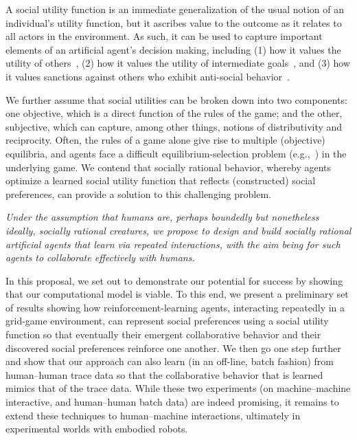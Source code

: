 A social utility function is an immediate generalization of the usual
notion of an individual's utility function, but it ascribes value to
the outcome as it relates to all actors in the environment.
%
%
As such, it can be used to capture important elements of an artificial
agent's decision making, including (1) how it values the utility of
others~\cite{littman01d}, (2) how it values the utility of
intermediate goals~\cite{macglashan15b}, and (3) how it values
sanctions against others who exhibit anti-social
behavior~\cite{macglashan14c}.

We further assume that social utilities can be broken down into two
components: one objective, which is a direct function of the rules of
the game; and the other, subjective, which can capture, among other
things, notions of distributivity and reciprocity.
%
Often, the rules of a game alone give rise to multiple (objective)
equilibria, and agents face a difficult equilibrium-selection problem
(e.g.,~\cite{schelling1980strategy}) in the underlying game.  We
contend that socially rational behavior, whereby agents optimize a
learned social utility function that reflects (constructed) social
preferences, can provide a solution to this challenging problem.


\emph{Under the assumption that humans are, perhaps boundedly but
  nonetheless ideally, socially rational creatures, we propose to
  design and build socially rational artificial agents that learn via
  repeated interactions, with the aim being for such agents to
  collaborate effectively with humans.}

In this proposal, we set out to demonstrate our potential for success
by showing that our computational model is viable.  To this end,
we present a preliminary set of results showing how
reinforcement-learning agents, interacting repeatedly in a grid-game
environment, can represent social preferences using a social utility
function so that eventually their emergent collaborative behavior and
their discovered social preferences reinforce one another.  We then go
one step further and show that our approach can also learn (in an
off-line, batch fashion) from human--human trace data so that the
collaborative behavior that is learned mimics that of the trace data.
While these two experiments (on machine--machine interactive, and
human--human batch data) are indeed promising, it remains to extend
these techniques to human--machine interactions, ultimately in
experimental worlds with embodied robots.

